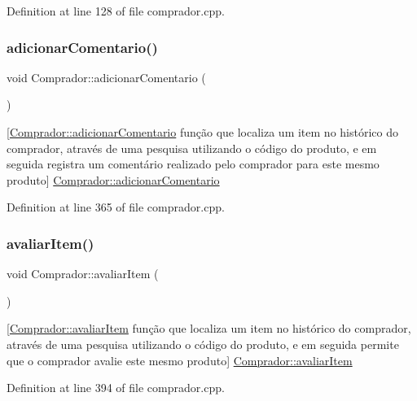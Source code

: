 Definition at line 128 of file comprador.\+cpp.

\mbox{\label{class_comprador_aef06de4d0e7dfaeb5ad5411e895e31b3}} 
\subsubsection{\texorpdfstring{adicionar\+Comentario()}{adicionarComentario()}}
{\footnotesize\ttfamily void Comprador\+::adicionar\+Comentario (\begin{DoxyParamCaption}{ }\end{DoxyParamCaption})}

\mbox{[}\hyperlink{class_comprador_aef06de4d0e7dfaeb5ad5411e895e31b3}{Comprador\+::adicionar\+Comentario} função que localiza um item no histórico do comprador, através de uma pesquisa utilizando o código do produto, e em seguida registra um comentário realizado pelo comprador para este mesmo produto\mbox{]}  \hyperlink{class_comprador_aef06de4d0e7dfaeb5ad5411e895e31b3}{Comprador\+::adicionar\+Comentario} 

Definition at line 365 of file comprador.\+cpp.

\mbox{\label{class_comprador_a10b29882e2737563350cdf6f157d82b4}} 
\subsubsection{\texorpdfstring{avaliar\+Item()}{avaliarItem()}}
{\footnotesize\ttfamily void Comprador\+::avaliar\+Item (\begin{DoxyParamCaption}{ }\end{DoxyParamCaption})}

\mbox{[}\hyperlink{class_comprador_a10b29882e2737563350cdf6f157d82b4}{Comprador\+::avaliar\+Item} função que localiza um item no histórico do comprador, através de uma pesquisa utilizando o código do produto, e em seguida permite que o comprador avalie este mesmo produto\mbox{]}  \hyperlink{class_comprador_a10b29882e2737563350cdf6f157d82b4}{Comprador\+::avaliar\+Item} 

Definition at line 394 of file comprador.\+cpp.

\mbox{\label{class_comprador_a35d18c3bcfff0adfe8dd3b75f46f8bd8}} 
